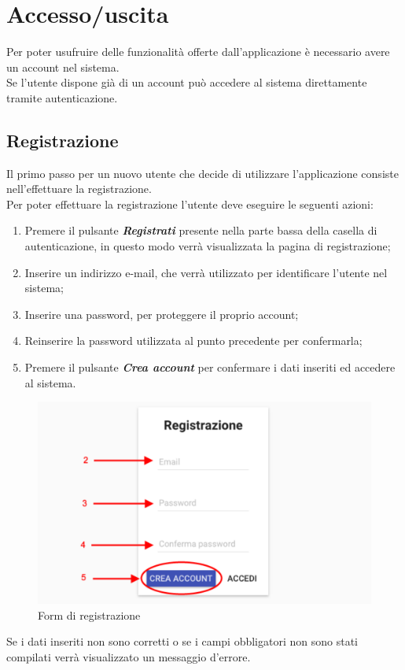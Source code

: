 \section{Accesso/uscita}
Per poter usufruire delle funzionalità offerte dall'applicazione \Premi è necessario avere un account nel sistema.\\Se l'utente dispone già di un account può accedere al sistema direttamente tramite autenticazione.
\subsection{Registrazione}
Il primo passo per un nuovo utente che decide di utilizzare l'applicazione \Premi consiste nell'effettuare la registrazione.\\Per poter effettuare la registrazione l'utente deve eseguire le seguenti azioni:
\begin{enumerate}
\item Premere il pulsante \textbf{\textit{Registrati}} presente nella parte bassa della casella di autenticazione, in questo modo verrà visualizzata la pagina di registrazione;
\item Inserire un indirizzo e-mail, che verrà utilizzato per identificare l'utente nel sistema;
\item Inserire una password, per proteggere il proprio account;
\item Reinserire la password utilizzata al punto precedente per confermarla;
\item Premere il pulsante \textbf{\textit{Crea account}} per confermare i dati inseriti ed accedere al sistema.
\end{enumerate}
\begin{figure}[H]
\centering
\includegraphics[scale=0.5]{immagini/imgRegistrazione.pdf}
\caption{Form di registrazione}
\end{figure}
Se i dati inseriti non sono corretti o se i campi obbligatori non sono stati compilati verrà visualizzato un messaggio d'errore.
